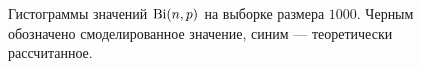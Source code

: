 \documentclass[12pt, a4paper]{article}
\begin{document}
\begin{figure}[H]
\begin{center}
{}
\end{center}
\caption{Гистограммы значений $\operatorname{Bi}(n, p)$ на выборке размера $1000$. Черным обозначено смоделированное значение, синим --- теоретически рассчитанное.}
\end{figure}

\begin{figure}[H]
\begin{center}
\subfigure[$r=4,\ p=0.4.$]{
}
\end{center}
\end{figure}
\end{document}
